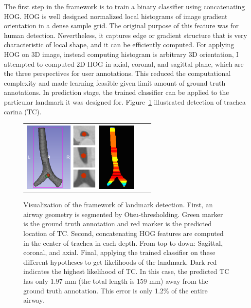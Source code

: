 The first step in the framework is to train a binary classifier using concatenating HOG.
HOG is well designed normalized local histograms of image gradient orientation in a dense sample grid.
The original purpose of this feature was for human detection.
Nevertheless, it captures edge or gradient structure that is very characteristic of local shape, and it can be efficiently computed.
For applying HOG on 3D image, instead computing histogram is arbitrary 3D orientation, I attempted to computed 2D HOG in axial, coronal, and sagittal plane, which are the three perspectives for user annotations.
This reduced the computational complexity and made learning feasible given limit amount of ground truth annotations.
In prediction stage, the trained classifier can be applied to the particular landmark it was designed for.
Figure~\ref{fig:detection} illustrated detection of trachea carina (TC).

\begin{figure}[tb]
  \begin{center}
    \begin{tabular}{ccc}
    \includegraphics[height=34.5mm] {fig/Fleck_005_geometry.png}
    \includegraphics[height=35mm] {fig/landmark.png}
    \includegraphics[height=34.5mm] {fig/Fleck_005_likelihood.png}
    \end{tabular}
    \caption{ \label{fig:detection} Visualization of the framework of landmark detection. First, an airway geometry is segmented by Otsu-thresholding. Green marker is the ground truth annotation and red marker is the predicted location of TC. Second, concatenating HOG features are computed in the center of trachea in each depth. From top to down: Sagittal, coronal, and axial. Final, applying the trained classifier on these different hypotheses to get likelihoods of the landmark. Dark red indicates the highest likelihood of TC. In this case, the predicted TC has only 1.97 mm (the total length is 159 mm) away from the ground truth annotation. This error is only 1.2$\%$ of the entire airway.
    }
  \end{center}
\end{figure}

